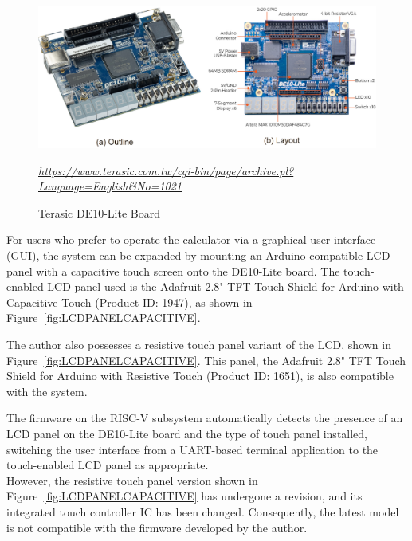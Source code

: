 \begin{figure}[htbp]
  \centering
  \includegraphics[width=1.0\textwidth]{./Figure/DE10LITE.png}
  \caption{Terasic DE10-Lite Board}
  \scriptsize{\textit{\url{https://www.terasic.com.tw/cgi-bin/page/archive.pl?Language=English&No=1021}}}
  \label{fig:DE10LITE}
\end{figure}

For users who prefer to operate the calculator via a graphical user interface (GUI), the system can be expanded by mounting an Arduino-compatible LCD panel with a capacitive touch screen onto the DE10-Lite board. The touch-enabled LCD panel used is the Adafruit 2.8" TFT Touch Shield for Arduino with Capacitive Touch (Product ID: 1947), as shown in Figure~\ref{fig:LCDPANELCAPACITIVE}.

The author also possesses a resistive touch panel variant of the LCD, shown in Figure~\ref{fig:LCDPANELCAPACITIVE}. This panel, the Adafruit 2.8" TFT Touch Shield for Arduino with Resistive Touch (Product ID: 1651), is also compatible with the system.

The firmware on the RISC-V subsystem automatically detects the presence of an LCD panel on the DE10-Lite board and the type of touch panel installed, switching the user interface from a UART-based terminal application to the touch-enabled LCD panel as appropriate.\\

However, the resistive touch panel version shown in Figure~\ref{fig:LCDPANELCAPACITIVE} has undergone a revision, and its integrated touch controller IC has been changed. Consequently, the latest model is not compatible with the firmware developed by the author.

